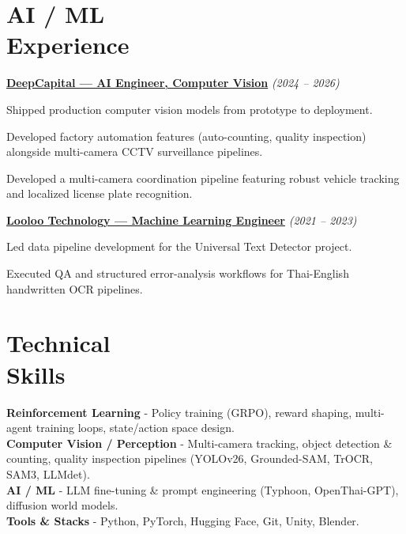 \documentclass[margin,line]{resume}
\begin{document}
\begin{resume}
    \section{\mysidestyle \textbf{AI / ML\\Experience}}

    \underline{\textbf{DeepCapital --- AI Engineer, Computer Vision}} \hfill \textit{(2024 -- 2026)} \vspace{0.3mm}
    \begin{list2}
    \item Shipped production computer vision models from prototype to deployment.
    \item Developed factory automation features (auto-counting, quality inspection) alongside multi-camera CCTV surveillance pipelines.
    \item Developed a multi-camera coordination pipeline featuring robust vehicle tracking and localized license plate recognition.
    \end{list2}
    \vspace{-3mm}
    
    \underline{\textbf{Looloo Technology --- Machine Learning Engineer}} \hfill \textit{(2021 -- 2023)} \vspace{0.3mm}
    \begin{list2}
    \item Led data pipeline development for the Universal Text Detector project.
    \item Executed QA and structured error-analysis workflows for Thai-English handwritten OCR pipelines.
    \end{list2}
    \vspace{-3mm}

    \section{\mysidestyle \textbf{Technical\\Skills}} 
    
    \textbf{Reinforcement Learning} - Policy training (GRPO), reward shaping, multi-agent training loops, state/action space design. \\
    \textbf{Computer Vision / Perception} - Multi-camera tracking, object detection \& counting, quality inspection pipelines (YOLOv26, Grounded-SAM, TrOCR, SAM3, LLMdet). \\
    \textbf{AI / ML} - LLM fine-tuning \& prompt engineering (Typhoon, OpenThai-GPT), diffusion world models. \\
    \textbf{Tools \& Stacks} - Python, PyTorch, Hugging Face, Git, Unity, Blender.
    \vspace{-3mm}

\end{resume}
\end{document}
